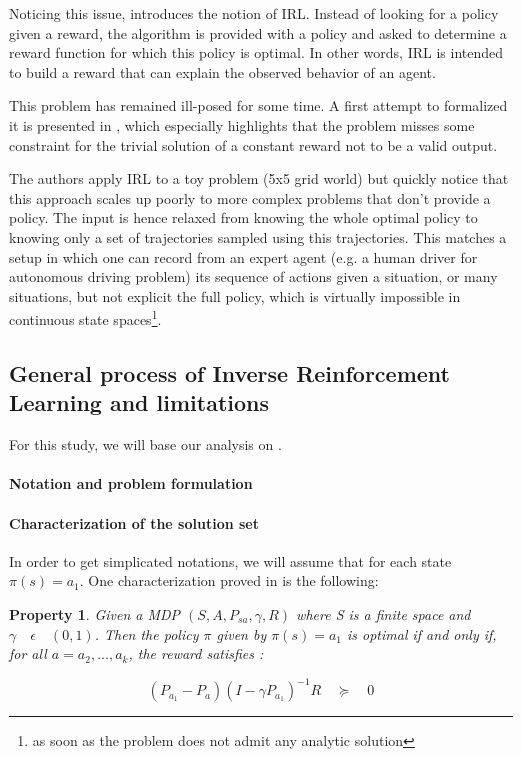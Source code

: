 \documentclass{article}
\newtheorem{property}{Property}
\begin{document}
Noticing this issue, \cite{Russell98} introduces the notion of IRL. Instead of looking for a policy given a reward, the algorithm is provided with a policy and asked to determine a reward function for which this policy is optimal. In other words, IRL is intended to build a reward that can explain the observed behavior of an agent.

This problem has remained ill-posed for some time. A first attempt to formalized it is presented in \cite{Ng00}, which especially highlights that the problem misses some constraint for the trivial solution of a constant reward not to be a valid output.

The authors apply IRL to a toy problem (5x5 grid world) but quickly notice that this approach scales up poorly to more complex problems that don't provide a policy. The input is hence relaxed from knowing the whole optimal policy to knowing only a set of trajectories sampled using this trajectories. This matches a setup in which one can record from an expert agent (e.g. a human driver for autonomous driving problem) its sequence of actions given a situation, or many situations, but not explicit the full policy, which is virtually impossible in continuous state spaces\footnote{as soon as the problem does not admit any analytic solution}.


\subsection{General process of Inverse Reinforcement Learning and limitations}

For this study, we will base our analysis on \cite{Ng00}.

\paragraph{Notation and problem formulation}

\paragraph{Characterization of the solution set}

In order to get simplicated notations, we will assume that for each state $\pi( s) = a_{1} $. 
One characterization proved in \cite{Ng00} is the following:

\begin{property}
Given a MDP  $(S,A,P_{sa},\gamma,R)$ where S is a finite space and $\gamma \quad \epsilon \quad (0,1)$. Then the policy $\pi$ given by $ \pi(s)=a_{1}$ is optimal if and only if, for all $a=a_{2},...,a_{k}$, the reward satisfies :

\[
({ P }_{ a_{ 1 } }-{ P }_{ a }){ (I-\gamma { P }_{ { a }_{ 1 } }) }^{ -1 }R\quad \succeq \quad 0
\]
\end{property}
\end{document}
